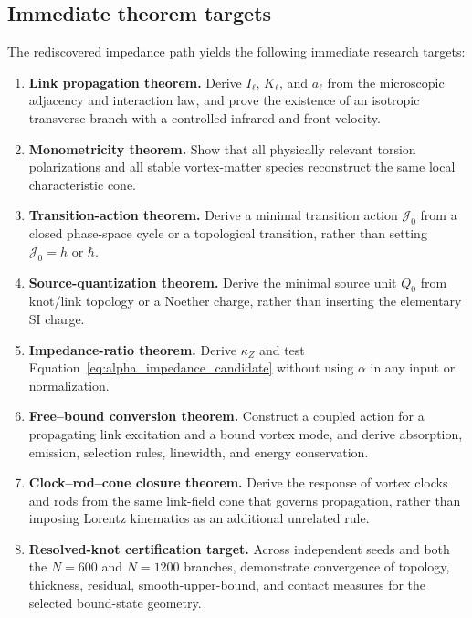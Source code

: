 \documentclass[11pt]{article}
\theoremstyle{definition}
\theoremstyle{plain}
\theoremstyle{remark}
\begin{document}
\subsection{Immediate theorem targets}
\label{subsec:genesis_immediate_theorem_targets}

The rediscovered impedance path yields the following immediate research targets:

\begin{enumerate}
    \item \textbf{Link propagation theorem.}
    Derive $I_\ell$, $K_\ell$, and $a_\ell$ from the microscopic adjacency and
    interaction law, and prove the existence of an isotropic transverse branch
    with a controlled infrared and front velocity.

    \item \textbf{Monometricity theorem.}
    Show that all physically relevant torsion polarizations and all stable
    vortex-matter species reconstruct the same local characteristic cone.

    \item \textbf{Transition-action theorem.}
    Derive a minimal transition action $\mathcal J_0$ from a closed phase-space
    cycle or a topological transition, rather than setting
    $\mathcal J_0=h$ or $\hbar$.

    \item \textbf{Source-quantization theorem.}
    Derive the minimal source unit $Q_0$ from knot/link topology or a Noether
    charge, rather than inserting the elementary SI charge.

    \item \textbf{Impedance-ratio theorem.}
    Derive $\kappa_Z$ and test
    Equation~\eqref{eq:alpha_impedance_candidate} without using $\alpha$ in any
    input or normalization.

    \item \textbf{Free--bound conversion theorem.}
    Construct a coupled action for a propagating link excitation and a bound
    vortex mode, and derive absorption, emission, selection rules, linewidth,
    and energy conservation.

    \item \textbf{Clock--rod--cone closure theorem.}
    Derive the response of vortex clocks and rods from the same link-field cone
    that governs propagation, rather than imposing Lorentz kinematics as an
    additional unrelated rule.

    \item \textbf{Resolved-knot certification target.}
    Across independent seeds and both the $N=600$ and $N=1200$ branches,
    demonstrate convergence of topology, thickness, residual,
    smooth-upper-bound, and contact measures for the selected bound-state
    geometry.


\end{enumerate}
\end{document}
